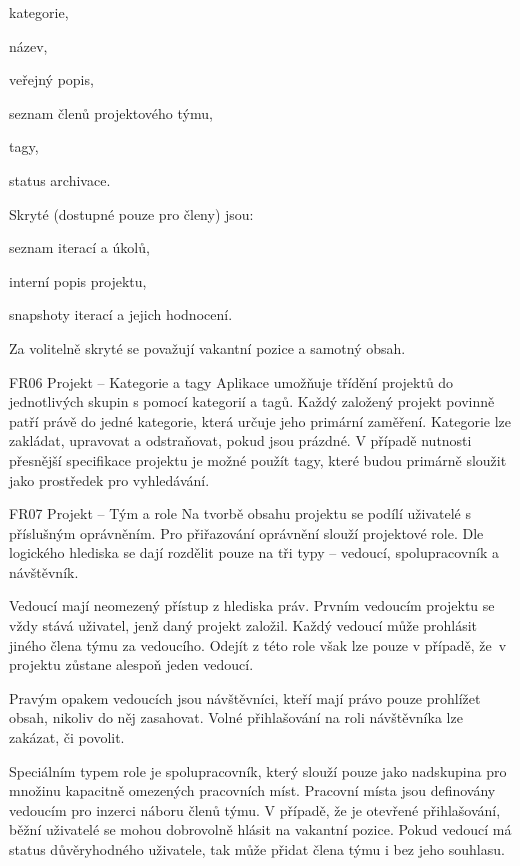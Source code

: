 \begin{dl}
   \begin{ulnar}
      \item kategorie,
      \item název,
      \item veřejný popis,
      \item seznam členů projektového týmu,
      \item tagy,
      \item status archivace.
   \end{ulnar}


   Skryté (dostupné pouze pro členy) jsou: 

   \begin{ulnar}
      \item seznam iterací a úkolů, 
      \item interní popis projektu, 
      \item snapshoty iterací a jejich hodnocení.
   \end{ulnar}
   

   Za volitelně skryté se považují vakantní pozice a samotný obsah.

   \item[FR06 Projekt -- Kategorie a tagy]
   Aplikace umožňuje třídění projektů do jednotlivých skupin s pomocí kategorií a tagů. Každý založený projekt povinně patří právě do jedné kategorie, která určuje jeho primární zaměření. Kategorie lze zakládat, upravovat a odstraňovat, pokud jsou prázdné. V případě nutnosti přesnější specifikace projektu je možné použít tagy, které budou primárně sloužit jako prostředek pro vyhledávání.

   \item[FR07 Projekt -- Tým a role]
   Na tvorbě obsahu projektu se podílí uživatelé s příslušným oprávněním. Pro přiřazování oprávnění slouží projektové role. Dle logického hlediska se dají rozdělit pouze na tři typy -- vedoucí, spolupracovník a návštěvník.

   \newpage
   Vedoucí mají neomezený přístup z hlediska práv. Prvním vedoucím projektu se vždy stává uživatel, jenž daný projekt založil. Každý vedoucí může prohlásit jiného člena týmu za vedoucího. Odejít z této role však lze pouze v případě, že~v projektu zůstane alespoň jeden vedoucí.

   Pravým opakem vedoucích jsou návštěvníci, kteří mají právo pouze prohlížet obsah, nikoliv do něj zasahovat. Volné přihlašování na roli návštěvníka lze zakázat, či povolit.

   Speciálním typem role je spolupracovník, který slouží pouze jako nadskupina pro množinu kapacitně omezených pracovních míst. Pracovní místa jsou definovány vedoucím pro inzerci náboru členů týmu. V případě, že je otevřené přihlašování, běžní uživatelé se mohou dobrovolně hlásit na vakantní pozice. Pokud vedoucí má status důvěryhodného uživatele, tak může přidat člena týmu i bez jeho souhlasu.


\end{dl}
